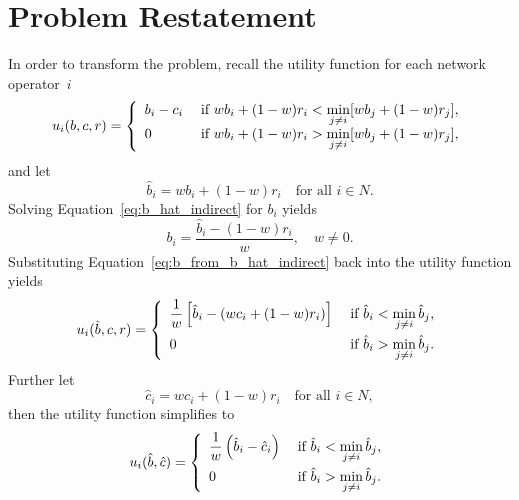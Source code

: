 \section{Problem Restatement} %
\label{sec:problem_restatement_indirect}
In order to transform the problem, recall the utility function for each network operator~$i$
\begin{equation}
  u_i(b,c,r) = \left\{
  \begin{array}{l l}
    b_i-c_i & \;\textrm{if } wb_i + (1-w)r_i < \displaystyle\min_{j\neq i}[wb_j + (1-w)r_j],\\
    0 & \;\textrm{if } wb_i + (1-w)r_i > \displaystyle\min_{j\neq i}[wb_j + (1-w)r_j],
  \end{array}\right.
\end{equation}
and let
\begin{equation}
  \label{eq:b_hat_indirect}
  \hat{b}_i = wb_i + (1-w)r_i \quad\textrm{for all } i\in N.
\end{equation}
Solving Equation~\eqref{eq:b_hat_indirect} for $b_i$ yields
\begin{equation}
  \label{eq:b_from_b_hat_indirect}
  b_i = \frac{\hat{b}_i - (1-w)r_i}{w}, \quad w\neq 0.
\end{equation}
Substituting Equation~\eqref{eq:b_from_b_hat_indirect} back into the utility function yields
\begin{equation}
  u_i(\hat{b},c,r) = \left\{
  \begin{array}{l l}
    \displaystyle\frac{1}{w}\left[\hat{b}_i-(wc_i + (1-w)r_i)\right] & \;\textrm{if } \hat{b}_i < \displaystyle\min_{j\neq i}\hat{b}_j,\\[2ex]
    0 & \;\textrm{if } \hat{b}_i > \displaystyle\min_{j\neq i}\hat{b}_j.
  \end{array}\right.
\end{equation}
Further let
\begin{equation}
  \label{eq:cost_hat_indirect}
  \hat{c}_i = wc_i + (1-w)r_i \quad\textrm{for all } i\in N,
\end{equation}
then the utility function simplifies to
\begin{equation}
  \label{eq:sellers_utility_hat_full_indirect}
  u_i(\hat{b},\hat{c}) = \left\{
  \begin{array}{l l}
    \displaystyle\frac{1}{w}\left(\hat{b}_i-\hat{c}_i\right) & \;\textrm{if } \hat{b}_i < \displaystyle\min_{j\neq i}\hat{b}_j,\\[2ex]
    0 & \;\textrm{if } \hat{b}_i > \displaystyle\min_{j\neq i}\hat{b}_j.
  \end{array}\right.
\end{equation}

